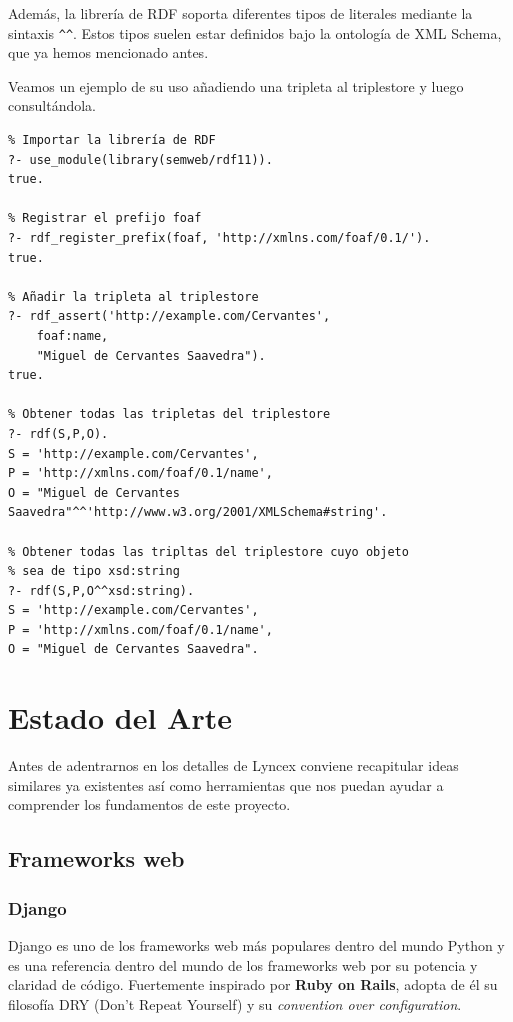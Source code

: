 \documentclass[12pt]{report} %
\begin{document}
Además, la librería de RDF soporta diferentes tipos de literales mediante la sintaxis \verb|^^|. Estos tipos suelen estar definidos bajo la ontología de XML Schema, que ya hemos mencionado antes.

Veamos un ejemplo de su uso añadiendo una tripleta al triplestore y luego consultándola.

\begin{adjustbox}{width=\textwidth,keepaspectratio}
\begin{lstlisting}
% Importar la librería de RDF
?- use_module(library(semweb/rdf11)).
true.

% Registrar el prefijo foaf
?- rdf_register_prefix(foaf, 'http://xmlns.com/foaf/0.1/').
true.

% Añadir la tripleta al triplestore
?- rdf_assert('http://example.com/Cervantes', 
    foaf:name, 
    "Miguel de Cervantes Saavedra").
true.

% Obtener todas las tripletas del triplestore
?- rdf(S,P,O).
S = 'http://example.com/Cervantes',
P = 'http://xmlns.com/foaf/0.1/name',
O = "Miguel de Cervantes Saavedra"^^'http://www.w3.org/2001/XMLSchema#string'.

% Obtener todas las tripltas del triplestore cuyo objeto
% sea de tipo xsd:string
?- rdf(S,P,O^^xsd:string).
S = 'http://example.com/Cervantes',
P = 'http://xmlns.com/foaf/0.1/name',
O = "Miguel de Cervantes Saavedra".
\end{lstlisting}
\end{adjustbox}


\chapter{Estado del Arte}

Antes de adentrarnos en los detalles de Lyncex conviene recapitular ideas similares ya existentes así como herramientas que nos puedan ayudar a comprender los fundamentos de este proyecto.

\section{Frameworks web}

\subsection{Django}
Django es uno de los frameworks web más populares dentro del mundo Python y es una referencia dentro del mundo de los frameworks web por su potencia y claridad de código.\cite{django}
Fuertemente inspirado por \textbf{Ruby on Rails}, adopta de él su filosofía DRY (Don't Repeat Yourself) y su \textit{convention over configuration}.
\end{document}

